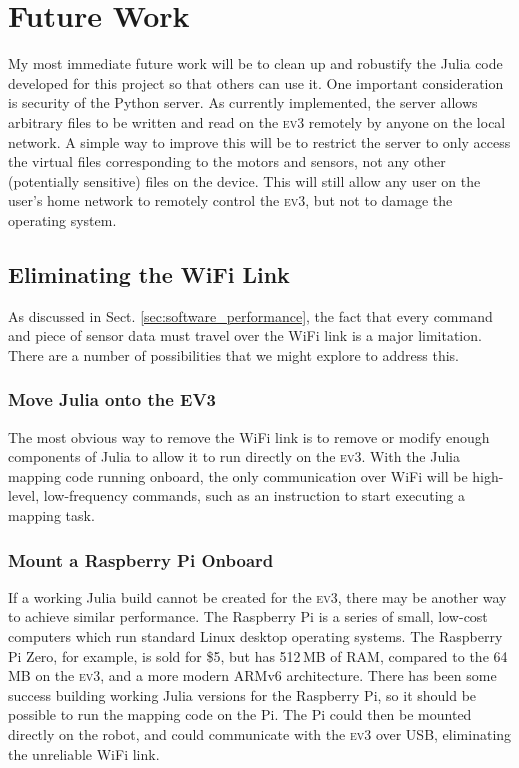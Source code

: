 \documentclass[]{article}
\newcommand{\ev}{\textsc{ev3}}
\begin{document}
\section{Future Work}

My most immediate future work will be to clean up and robustify the Julia code developed for this project so that others can use it. One important consideration is security of the Python server. As currently implemented, the server allows arbitrary files to be written and read on the \ev{} remotely by anyone on the local network. A simple way to improve this will be to restrict the server to only access the virtual files corresponding to the motors and sensors, not any other (potentially sensitive) files on the device. This will still allow any user on the user's home network to remotely control the \ev{}, but not to damage the operating system.

\subsection{Eliminating the WiFi Link}
\label{sec:future_comms}

As discussed in Sect. \ref{sec:software_performance}, the fact that every command and piece of sensor data must travel over the WiFi link is a major limitation. There are a number of possibilities that we might explore to address this. 

\subsubsection{Move Julia onto the EV3}
The most obvious way to remove the WiFi link is to remove or modify enough components of Julia to allow it to run directly on the \ev{}. With the Julia mapping code running onboard, the only communication over WiFi will be high-level, low-frequency commands, such as an instruction to start executing a mapping task. 

\subsubsection{Mount a Raspberry Pi Onboard}
If a working Julia build cannot be created for the \ev{}, there may be another way to achieve similar performance. The Raspberry Pi is a series of small, low-cost computers which run standard Linux desktop operating systems. The Raspberry Pi Zero, for example, is sold for \$5, but has 512\,MB of RAM, compared to the 64\,MB on the \ev{}, and a more modern ARMv6 architecture. There has been some success building working Julia versions for the Raspberry Pi, so it should be possible to run the mapping code on the Pi. The Pi could then be mounted directly on the robot, and could communicate with the \ev{} over USB, eliminating the unreliable WiFi link. 
\end{document}
